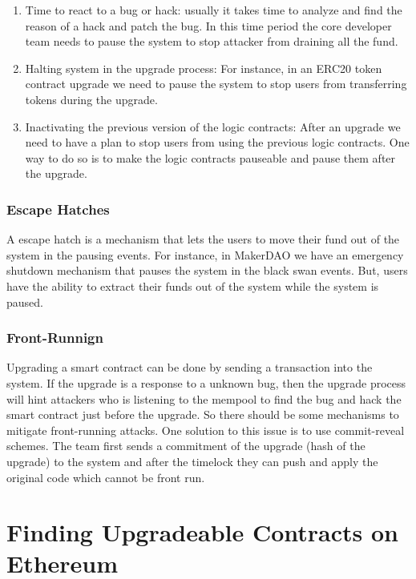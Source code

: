 \begin{enumerate}
  \item Time to react to a bug or hack: usually it takes time to analyze and find the reason of a hack and patch the bug. In this time period the core developer team needs to pause the system to stop attacker from draining all the fund.
  \item Halting system in the upgrade process: For instance, in an ERC20 token contract upgrade we need to pause the system to stop users from transferring tokens during the upgrade. 
  \item Inactivating the previous version of the logic contracts: After an upgrade we need to have a plan to stop users from using the previous logic contracts. One way to do so is to make the logic contracts pauseable and pause them after the upgrade. 
\end{enumerate}

\subsubsection{Escape Hatches}
A escape hatch is a mechanism that lets the users to move their fund out of the system in the pausing events. For instance, in MakerDAO we have an emergency shutdown mechanism that pauses the system in the black swan events. But, users have the ability to extract their funds out of the system while the system is paused.
\subsubsection{Front-Runnign}
Upgrading a smart contract can be done by sending a transaction into the system. If the upgrade is a response to a unknown bug, then the upgrade process will hint attackers who is listening to the mempool to find the bug and hack the smart contract just before the upgrade. So there should be some mechanisms to mitigate front-running attacks. One solution to this issue is to use commit-reveal schemes. The team first sends a commitment of the upgrade (hash of the upgrade) to the system and after the timelock they can push and apply the original code which cannot be front run. 





 \section{Finding Upgradeable Contracts on Ethereum}

